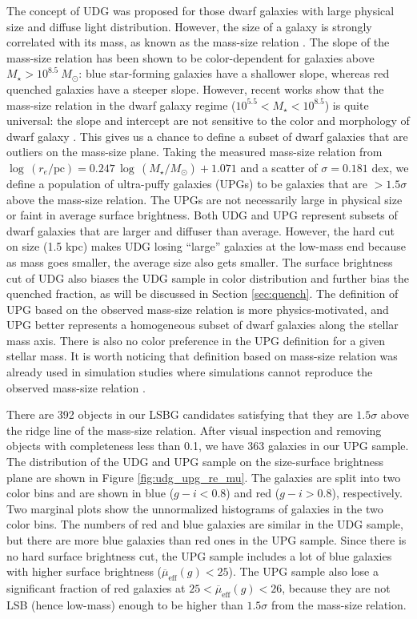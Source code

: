 \documentclass[twocolumn,astrosymb,twocolappendix]{aastex631}
\newcommand{\sbeff}{\overline{\mu}_{\mathrm{eff}}(g)}
\begin{document}
\begin{CJK*}{UTF8}{gbsn}
The concept of UDG was proposed for those dwarf galaxies with large physical size and diffuse light distribution. However, the size of a galaxy is strongly correlated with its mass, as known as the mass-size relation \citep[e.g.,][]{Lange2015}. The slope of the mass-size relation has been shown to be color-dependent for galaxies above $M_\star > 10^{8.5}\ M_\odot$: blue star-forming galaxies have a shallower slope, whereas red quenched galaxies have a steeper slope. However, recent works show that the mass-size relation in the dwarf galaxy regime ($10^{5.5} < M_\star < 10^{8.5}$) is quite universal: the slope and intercept are not sensitive to the color and morphology of dwarf galaxy \citep{ELVES-I}. This gives us a chance to define a subset of dwarf galaxies that are outliers on the mass-size plane. Taking the measured mass-size relation from \citet{ELVES-I} $\log\, (r_e/\mathrm{pc}) = 0.247\, \log\, (M_\star/M_\odot) + 1.071$ and a scatter of $\sigma=0.181$ dex, we define a population of ultra-puffy galaxies (UPGs) to be galaxies that are $>1.5\sigma$ above the mass-size relation. The UPGs are not necessarily large in physical size or faint in average surface brightness. Both UDG and UPG represent subsets of dwarf galaxies that are larger and diffuser than average. However, the hard cut on size (1.5 kpc) makes UDG losing ``large'' galaxies at the low-mass end because as mass goes smaller, the average size also gets smaller. The surface brightness cut of UDG also biases the UDG sample in color distribution and further bias the quenched fraction, as will be discussed in Section \ref{sec:quench}. The definition of UPG based on the observed mass-size relation is more physics-motivated, and UPG better represents a homogeneous subset of dwarf galaxies along the stellar mass axis. There is also no color preference in the UPG definition for a given stellar mass. It is worth noticing that definition based on mass-size relation was already used in simulation studies where simulations cannot reproduce the observed mass-size relation \citep[e.g.,][]{Benavides2021}.

There are 392 objects in our LSBG candidates satisfying that they are $1.5\sigma$ above the ridge line of the mass-size relation. After visual inspection and removing objects with completeness less than 0.1, we have 363 galaxies in our UPG sample. The distribution of the UDG and UPG sample on the size-surface brightness plane are shown in Figure \ref{fig:udg_upg_re_mu}. The galaxies are split into two color bins and are shown in blue ($g-i < 0.8$) and red ($g-i > 0.8$), respectively. Two marginal plots show the unnormalized histograms of galaxies in the two color bins. The numbers of red and blue galaxies are similar in the UDG sample, but there are more blue galaxies than red ones in the UPG sample. Since there is no hard surface brightness cut, the UPG sample includes a lot of blue galaxies with higher surface brightness ($\sbeff < 25$). The UPG sample also lose a significant fraction of red galaxies at $25 < \sbeff < 26$, because they are not LSB (hence low-mass) enough to be higher than $1.5\sigma$ from the mass-size relation.


\end{CJK*}
\end{document}
